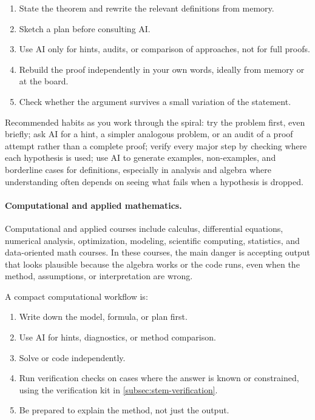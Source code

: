 \documentclass{SIAMbook2023}
\begin{document}
\begin{enumerate}
\item State the theorem and rewrite the relevant definitions from memory.
\item Sketch a plan before consulting AI.
\item Use AI only for hints, audits, or comparison of approaches, not for full proofs.
\item Rebuild the proof independently in your own words, ideally from memory or at the board.
\item Check whether the argument survives a small variation of the statement.
\end{enumerate}

Recommended habits as you work through the spiral: try the problem first, even briefly; ask AI for a hint, a simpler analogous problem, or an audit of a proof attempt rather than a complete proof; verify every major step by checking where each hypothesis is used; use AI to generate examples, non-examples, and borderline cases for definitions, especially in analysis and algebra where understanding often depends on seeing what fails when a hypothesis is dropped.

\paragraph{Computational and applied mathematics.}
Computational and applied courses include calculus, differential equations, numerical analysis, optimization, modeling, scientific computing, statistics, and data-oriented math courses. In these courses, the main danger is accepting output that looks plausible because the algebra works or the code runs, even when the method, assumptions, or interpretation are wrong.

A compact computational workflow is:

\begin{enumerate}
\item Write down the model, formula, or plan first.
\item Use AI for hints, diagnostics, or method comparison.
\item Solve or code independently.
\item Run verification checks on cases where the answer is known or constrained, using the verification kit in \cref{subsec:stem-verification}.
\item Be prepared to explain the method, not just the output.
\end{enumerate}
\end{document}
